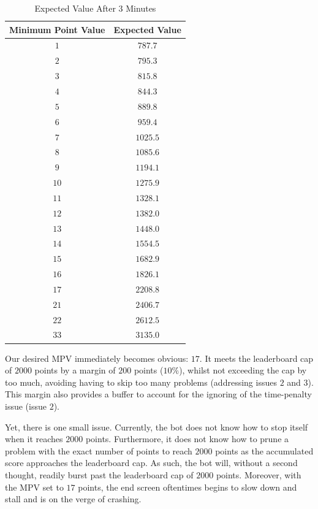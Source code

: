 \documentclass{article}
\begin{document}
\begin{table}[H]
    \begin{tabular}{|c|c|}
        \hline
        \textbf{Minimum Point Value} & \textbf{Expected Value} \\
        \hline
        \hline

        $1$ & $787.7$ \\
        $2$ & $795.3$ \\
        $3$ & $815.8$ \\
        $4$ & $844.3$ \\
        $5$ & $889.8$ \\
        $6$ & $959.4$ \\
        $7$ & $1025.5$ \\
        $8$ & $1085.6$ \\
        $9$ & $1194.1$ \\
        $10$ & $1275.9$ \\
        $11$ & $1328.1$ \\
        $12$ & $1382.0$ \\
        $13$ & $1448.0$ \\
        $14$ & $1554.5$ \\
        $15$ & $1682.9$ \\
        $16$ & $1826.1$ \\
        $17$ & $2208.8$ \\
        $21$ & $2406.7$ \\
        $22$ & $2612.5$ \\
        $33$ & $3135.0$ \\

        \hline
    \end{tabular}
    \centering
    \caption{Expected Value After 3 Minutes}\label{table:final_expected_value}
\end{table}

Our desired MPV immediately becomes obvious: $17$. It meets the leaderboard cap of $2000$ points by a margin of $200$ points ($10\%$), whilst not exceeding the cap by too much, avoiding having to skip too many problems (addressing issues $2$ and $3$). This margin also provides a buffer to account for the ignoring of the time-penalty issue (issue $2$).

Yet, there is one small issue. Currently, the bot does not know how to stop itself when it reaches $2000$ points. Furthermore, it does not know how to prune a problem with the exact number of points to reach $2000$ points as the accumulated score approaches the leaderboard cap. As such, the bot will, without a second thought, readily burst past the leaderboard cap of $2000$ points. Moreover, with the MPV set to $17$ points, the end screen oftentimes begins to slow down and stall and is on the verge of crashing.
\end{document}
